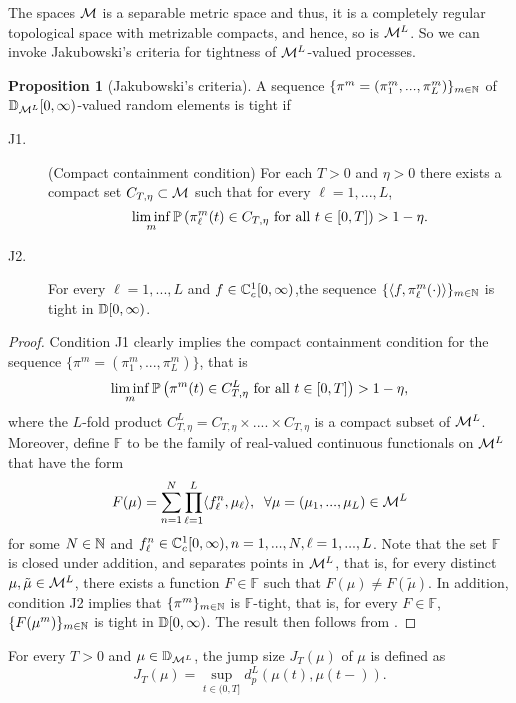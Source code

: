 \documentclass{article}
\theoremstyle{definition}
\newtheorem{proposition}[theorem]{Proposition}
\numberwithin{equation}{section}
\begin{document}
The spaces $\mathcal{M}$ is a separable metric space and thus, it is a completely regular topological space with metrizable compacts, and hence, so is $\mathcal{M}^L$. So we can invoke Jakubowski's criteria  \cite[Theorem 4.6]{Jak86} for tightness of $\mathcal{M}^L$-valued processes. 

\begin{proposition}[Jakubowski's criteria]\label{Jakob}
A sequence $\{\pi^m=(\pi^m_1,...,\pi^m_L)\}_{m\in\mathbb{N}}$ of $\mathbb{D}_{\mathcal{M}^L}[0,\infty)$-valued random elements is tight if%
\begin{description}
  \item [J1.] (Compact containment condition) For each $T>0$ and $\eta>0$ there exists a compact set $C_{T,\eta}\subset\mathcal{M}$ such that for every $\ell=1,...,L$,
      \[\liminf_{m}\mathbb{P}\left(\pi_\ell^m(t)\in C_{T,\eta}\text{ for all }t\in[0,T] \right)>1-\eta.\]

  \item [J2.] For every $\ell=1,...,L$ and  $f\in\mathbb{C}^1_c[0,\infty)$,the sequence $\{\langle f,\pi^m_\ell(\cdot)\rangle\}_{m\in\mathbb{N}}$ is tight in $\mathbb{D}[0,\infty)$.
\end{description}
\end{proposition}
\begin{proof}
Condition J1 clearly implies the compact containment condition for the sequence $\{\pi^m=(\pi^m_1,...,\pi^m_L)\}$, that is
\[
\liminf_{m}\mathbb{P}\left(\pi^m(t)\in C_{T,\eta}^L\text{ for all }t\in[0,T] \right)>1-\eta,
\]
where the $L$-fold product $C_{T,\eta}^L=C_{T,\eta}\times....\times C_{T,\eta}$ is a compact subset of $\mathcal{M}^L$. Moreover, define $\mathbb{F}$ to be the family of real-valued continuous functionals on $\mathcal{M}^L$ that have the form 
\[F(\mu)=\sum_{n=1}^N\prod_{\ell=1}^L\langle f^n_\ell,\mu_\ell\rangle,\;\; \forall\mu=(\mu_1,...,\mu_L)\in\mathcal{M}^L\]
for some $N\in\mathbb{N}$ and $f^n_\ell\in\mathbb{C}^1_c[0,\infty),n=1,...,N,\ell=1,...,L$. Note that the set $\mathbb{F}$ is closed under addition, and  separates points in $\mathcal{M}^L$, that is, for every distinct $\mu,\tilde\mu\in\mathcal{M}^L$, there exists a function $F\in\mathbb{F}$ such that $F(\mu)\neq F(\tilde \mu)$. In addition, condition J2 implies that $\{\pi^m\}_{m\in\mathbb{N}}$ is $\mathbb{F}$-tight, that is, for every $F\in\mathbb{F}$, $\{F(\mu^m)\}_{m\in\mathbb{N}}$ is tight in $\mathbb{D}[0,\infty)$. The result then follows from \cite[Theorem 4.6]{Jak86}.
\end{proof}

For every $T>0$ and $\mu\in\mathbb{D}_{\mathcal{M}^L}$, the jump size $J_T(\mu)$ of $\mu$ is defined as
\[
J_T(\mu)=\sup_{t\in(0,T]} d_p^L (\mu(t),\mu(t-)).
\]
\end{document}
